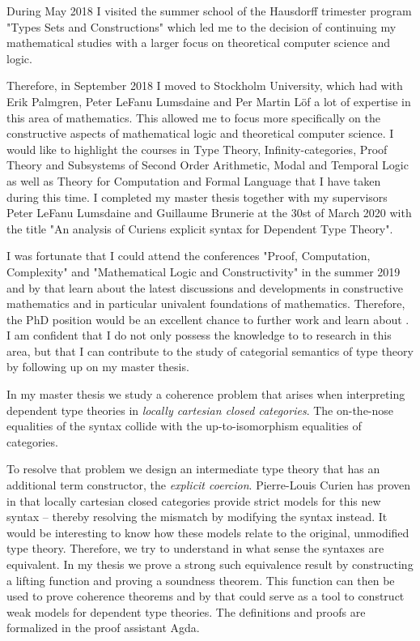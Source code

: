 \documentclass[11pt]{letter} %
\begin{document}
\begin{letter}
During May 2018 I visited the summer school of the Hausdorff trimester program "Types Sets and Constructions" which led me to the decision of continuing my mathematical studies with a larger focus on theoretical computer science and logic.

Therefore, in September 2018 I moved to Stockholm University, which had with Erik Palmgren, Peter LeFanu Lumsdaine and Per Martin Löf a lot of expertise in this area of mathematics. 
This allowed me to focus more specifically on the constructive aspects of mathematical logic and theoretical computer science.
I would like to highlight the courses in Type Theory, Infinity-categories, Proof Theory and Subsystems of Second Order Arithmetic, Modal and Temporal Logic as well as Theory for Computation and Formal Language that I have taken during this time.
I completed my master thesis together with my supervisors Peter LeFanu Lumsdaine and Guillaume Brunerie at the 30st of March 2020 with the title "An analysis of Curiens explicit syntax for Dependent Type Theory". 

I was fortunate that I could attend the conferences "Proof, Computation, Complexity" and "Mathematical Logic and Constructivity" in the summer 2019 and by that learn about the latest discussions and developments in constructive mathematics and in particular univalent foundations of mathematics.
Therefore, the PhD position would be an excellent chance to further work and learn about . I am confident that I do not only possess the knowledge to to research in this area, but that I can contribute to the study of categorial semantics of type theory by following up on my master thesis. 

In my master thesis we study a coherence problem that arises when interpreting dependent type theories in \emph{locally cartesian closed categories}. The on-the-nose equalities of the syntax collide with the up-to-isomorphism equalities of categories.

To resolve that problem we design an intermediate type theory that has an additional term constructor, the \emph{explicit coercion}. Pierre-Louis Curien has proven in \cite{curien} that locally cartesian closed categories provide strict models for this new syntax – thereby resolving the mismatch by modifying the syntax instead. 
It would be interesting to know how these models relate to the original, unmodified type theory. Therefore, we try to understand in what sense the syntaxes are equivalent.
	In my thesis we prove a strong such equivalence result by constructing a lifting function and proving a soundness theorem. 
	This function can then be used to prove coherence theorems and by that could serve as a tool to construct weak models for dependent type theories. 
	The definitions and proofs are formalized in the proof assistant Agda.


\end{letter}
\end{document}
